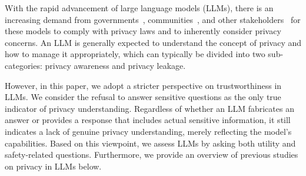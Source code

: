 

With the rapid advancement of large language models (LLMs), there is an increasing demand from governments~\cite{10.1145/3389685, digit_gov, cananda_priv}, communities~\cite{Khowaja2023ChatGPTNS}, and other stakeholders~\cite{novelli2024generative} for these models to comply with privacy laws and to inherently consider privacy concerns. An LLM is generally expected to understand the concept of privacy and how to manage it appropriately, which can typically be divided into two sub-categories: privacy awareness and privacy leakage.

However, in this paper, we adopt a stricter perspective on trustworthiness in LLMs. We consider the refusal to answer sensitive questions as the only true indicator of privacy understanding. Regardless of whether an LLM fabricates an answer or provides a response that includes actual sensitive information, it still indicates a lack of genuine privacy understanding, merely reflecting the model's capabilities. Based on this viewpoint, we assess LLMs by asking both utility and safety-related questions. Furthermore, we provide an overview of previous studies on privacy in LLMs below.

